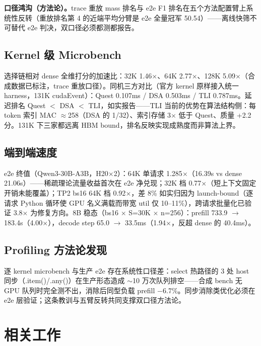 \documentclass[11pt]{article}
\begin{document}
\textbf{口径鸿沟（方法论）。}trace 重放 mass 排名与 e2e F1 排名在五个方法配置臂上系统性反转（重放排名第 4 的近端平均分臂是 e2e 全量冠军 50.54）——离线快筛不可替代 e2e 判决，双口径必须都测都报告。

\subsection{Kernel 级 Microbench}

选择链相对 dense 全维打分的加速比：32K 1.46$\times$、64K 2.77$\times$、128K 5.09$\times$（合成数据已标注，trace 重放口径）。同机三方对比（官方 kernel 原样接入统一 harness，131K cudaEvent）：Quest 0.107ms / DSA 0.503ms / TLI 0.787ms。延迟排名 Quest $<$ DSA $<$ TLI，如实报告——TLI 当前的优势在算法结构侧：每 token 索引 MAC $\approx$258（DSA 的 1/32）、索引存储 3$\times$ 低于 Quest、质量 +2.2 分。131K 下三家都远离 HBM bound，排名反映实现成熟度而非算法上界。

\subsection{端到端速度}

e2e 终值（Qwen3-30B-A3B，H20$\times$2）：64K 单请求 1.285$\times$（16.39s vs dense 21.06s）——稀疏理论流量收益首次在 e2e 净兑现；32K 档 0.77$\times$（短上下文固定开销未能覆盖）；TP2 bs16 64K 档 0.92$\times$，差 8\% 如实归因为 launch-bound（逐请求 Python 循环使 GPU 名义满载而带宽 util 仅 10--11\%），跨请求批量化已验证 3.8$\times$ 为修复方向。8B 稳态（bs16 $\times$ S=30K $\times$ n=256）：prefill 733.9 $\rightarrow$ 183.4s（4.00$\times$），decode step 65.0 $\rightarrow$ 33.5ms（1.94$\times$，反超 dense 的 40.4ms）。

\subsection{Profiling 方法论发现}

逐 kernel microbench 与生产 e2e 存在系统性口径差：select 热路径的 3 处 host 同步（.item()/.any()）在生产形态造成 $\sim$10 万次队列排空——合成 bench 无 GPU 队列时完全测不出，消除后同型负载 prefill $-$6.7\%。同步消除类优化必须在 e2e 层验证；这条教训与五臂反转共同支撑双口径方法论。

\section{相关工作}
\end{document}
